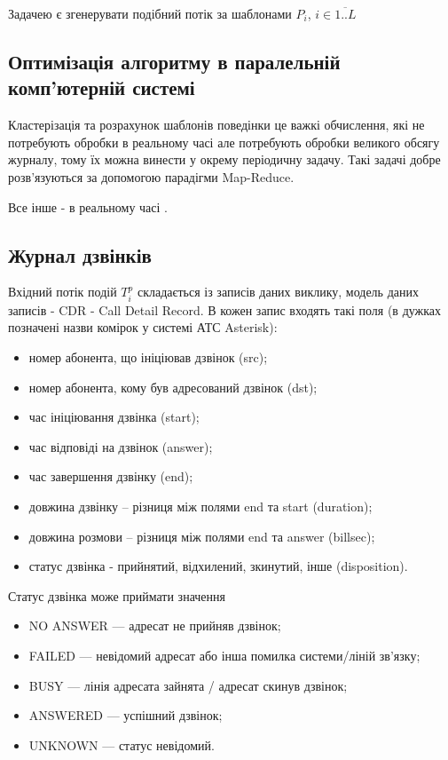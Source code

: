 Задачею є згенерувати подібний потік за шаблонами $P_i$, $i \in \overline{1..L} $

	\subsection{Оптимізація алгоритму в паралельній комп'ютерній системі}
	Кластерізація та розрахунок шаблонів поведінки це важкі обчислення, які не потребують обробки в реальному часі але потребують обробки великого обсягу журналу, тому їх можна винести у окрему періодичну задачу. Такі задачі добре розв'язуються за допомогою парадігми Map-Reduce.

	Все інше - в реальному часі \TBD.

\subsection{Журнал дзвінків}
  Вхідний потік подій ${T_i^p}$ складається із записів даних виклику, модель даних записів - CDR - Call Detail Record. В кожен запис входять такі поля (в дужках позначені назви комірок у системі АТС Asterisk):

   \begin{itemize}
    \item номер абонента, що ініціював дзвінок (src);
    \item номер абонента, кому був адресований дзвінок (dst);
    \item час ініціювання дзвінка (start);
    \item час відповіді на дзвінок (answer);
    \item час завершення дзвінку (end);
    \item довжина дзвінку -- різниця між полями end та start (duration);
    \item довжина розмови -- різниця між полями end та answer (billsec);
    \item статус дзвінка - прийнятий, відхилений, зкинутий, інше (disposition).
  \end{itemize}

  Статус дзвінка може приймати значення

  \begin{itemize}
    \item NO ANSWER --- адресат не прийняв дзвінок;
    \item FAILED --- невідомий адресат або інша помилка системи/ліній зв'язку;
    \item BUSY --- лінія адресата зайнята / адресат скинув дзвінок;
	\item ANSWERED --- успішний дзвінок;
	\item UNKNOWN --- статус невідомий.
  \end{itemize}

